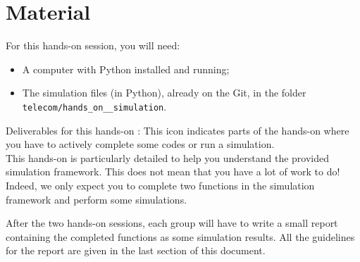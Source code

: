 \section*{Material}

For this hands-on session, you will need:
\begin{itemize}
    \item A computer with Python installed and running;
\item The simulation files (in Python), already on the Git, in the folder \texttt{telecom/hands\_on\_\_simulation}.
\end{itemize}
\begin{bclogo}[couleur = gray!20, arrondi = 0.2, logo=\bcinfo]{Deliverables for this hands-on}
\bccrayon: This icon indicates parts of the hands-on where you have to actively complete some codes or run a simulation.\\

This hands-on is particularly detailed to help you understand the provided simulation framework. This does not mean that you have a lot of work to do! Indeed, we only expect you to complete two functions in the simulation framework and perform some simulations.

After the two hands-on sessions, each group will have to write a small report containing the completed functions as some simulation results. All the guidelines for the report are given in the last section of this document.

\end{bclogo}
